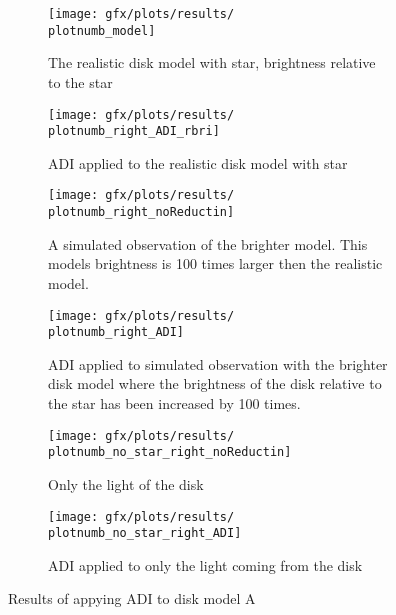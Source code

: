 \begin{figure}[h!]
  \newcommand{\plotnumb}{7}
  \begin{subfigure}[t]{0.6\textwidth}
    \texttt{[image: gfx/plots/results/\\plotnumb\_model]}
    \caption{The realistic disk model with star, brightness relative to the star}
  \end{subfigure}%
  \begin{subfigure}[t]{0.6\textwidth}
    \texttt{[image: gfx/plots/results/\\plotnumb\_right\_ADI\_rbri]}
    \caption{\ac{ADI} applied to the realistic disk model with star}
  \end{subfigure}
  
  \begin{subfigure}[b]{0.6\textwidth}
    \texttt{[image: gfx/plots/results/\\plotnumb\_right\_noReductin]}
    \caption{A simulated observation of the brighter model. This models brightness is 100 times larger then the realistic model.}
  \end{subfigure}%
  \begin{subfigure}[b]{0.6\textwidth}
    \texttt{[image: gfx/plots/results/\\plotnumb\_right\_ADI]}
    \caption{\ac{ADI} applied to simulated observation with the brighter disk model where the brightness of the disk relative to the star has been increased by 100 times.}
  \end{subfigure}
  
  \begin{subfigure}[t]{0.6\textwidth}
    \centering
    \texttt{[image: gfx/plots/results/\\plotnumb\_no\_star\_right\_noReductin]}
    \caption{Only the light of the disk}
  \end{subfigure}%
  \begin{subfigure}[t]{0.6\textwidth}
    \centering
    \texttt{[image: gfx/plots/results/\\plotnumb\_no\_star\_right\_ADI]}
    \caption{\ac{ADI} applied to only the light coming from the disk}
  \end{subfigure}


  \caption{Results of appying \ac{ADI} to disk model A}
  \label{fig:A}
\end{figure}
